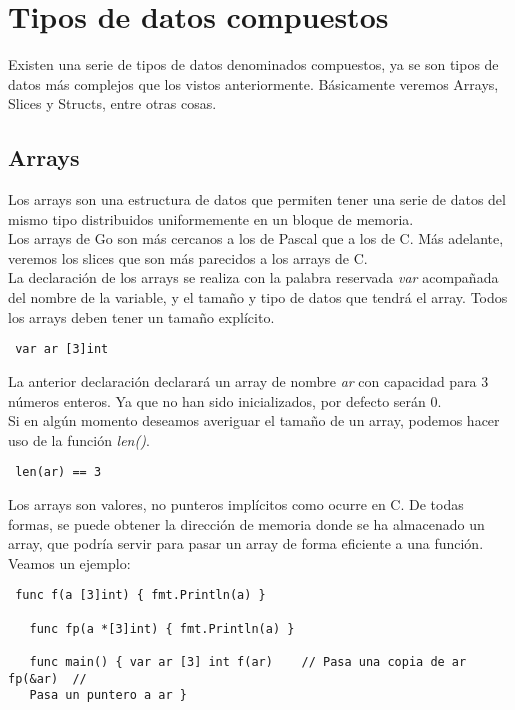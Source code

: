 
\chapter{Tipos de datos compuestos\label{datos_compuestos}}

Existen una serie de tipos de datos denominados compuestos, ya se son tipos de
datos más complejos que los vistos anteriormente. Básicamente veremos Arrays,
Slices y Structs, entre otras cosas.

\section{Arrays}

Los arrays son una estructura de datos que permiten tener una serie de datos del
mismo tipo distribuidos uniformemente en un bloque de memoria.\\

Los arrays de Go son más cercanos a los de Pascal que a los de C. Más adelante,
veremos los slices que son más parecidos a los arrays de C.\\

La declaración de los arrays se realiza con la palabra reservada \textit{var}
acompañada del nombre de la variable, y el tamaño y tipo de datos que tendrá el
array. Todos los arrays deben tener un tamaño explícito.

\begin{verbatim} var ar [3]int \end{verbatim}

La anterior declaración declarará un array de nombre \textit{ar} con capacidad
para 3 números enteros. Ya que no han sido inicializados, por defecto serán 0.\\

Si en algún momento deseamos averiguar el tamaño de un array, podemos hacer uso
de la función \textit{len()}.

\begin{verbatim} len(ar) == 3 \end{verbatim}

Los arrays son valores, no punteros implícitos como ocurre en C. De todas
formas, se puede obtener la dirección de memoria donde se ha almacenado un
array, que podría servir para pasar un array de forma eficiente a una función.
Veamos un ejemplo:

\begin{verbatim} func f(a [3]int) { fmt.Println(a) }
   
   func fp(a *[3]int) { fmt.Println(a) }
   
   func main() { var ar [3] int f(ar)    // Pasa una copia de ar fp(&ar)  //
   Pasa un puntero a ar } \end{verbatim}

